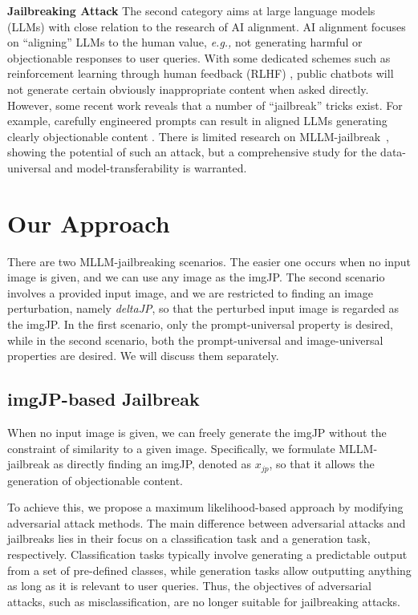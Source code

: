 \noindent\textbf{Jailbreaking Attack}
The second category aims at large language models (LLMs) with close relation to the research of AI alignment. AI alignment focuses on ``aligning'' LLMs to the human value, \emph{e.g.,} not generating harmful or objectionable responses to user queries. With some dedicated schemes such as reinforcement learning through human feedback (RLHF) \cite{ziegler2019fine}, public chatbots will not generate certain obviously inappropriate content when asked directly. However, some recent work reveals that a number of “jailbreak” tricks exist. For example, carefully engineered prompts can result in aligned LLMs generating clearly objectionable content \cite{shin2020autoprompt,wen2023hard,guo2021gradient,zou2023universal}. There is limited research on MLLM-jailbreak~\cite{bailey2023image, carlini2023aligned,qi2023visual}, showing the potential of such an attack, but a comprehensive study for the data-universal and model-transferability is warranted.

\section{Our Approach}
\label{sec:approach}
There are two MLLM-jailbreaking scenarios. The easier one occurs when no input image is given, and we can use any image as the imgJP. The second scenario involves a provided input image, and we are restricted to finding an image perturbation, namely \emph{deltaJP}, so that the perturbed input image is regarded as the imgJP. In the first scenario, only the prompt-universal property is desired, while in the second scenario, both the prompt-universal and image-universal properties are desired. We will discuss them separately.

\subsection{imgJP-based Jailbreak}
When no input image is given, we can freely generate the imgJP without the constraint of similarity to a given image. Specifically, we formulate MLLM-jailbreak as directly finding an imgJP, denoted as $x_{jp}$, so that it allows the generation of objectionable content. 

To achieve this, we propose a maximum likelihood-based approach by modifying adversarial attack methods. The main difference between adversarial attacks and jailbreaks lies in their focus on a classification task and a generation task, respectively. Classification tasks typically involve generating a predictable output from a set of pre-defined classes, while generation tasks allow outputting anything as long as it is relevant to user queries. Thus, the objectives of adversarial attacks, such as misclassification, are no longer suitable for jailbreaking attacks. 

